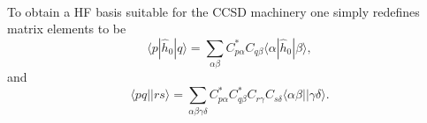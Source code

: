\paragraph*{}
To obtain a HF basis suitable for the CCSD machinery one simply redefines matrix elements to be
\begin{equation}
\langle p | \hat{h}_0 | q \rangle = \sum_{\alpha \beta} C_{p\alpha}^{*} C_{q \beta} \langle \alpha | \hat{h}_0 | \beta \rangle ,
\end{equation}
and 
\begin{equation}
\langle pq || rs \rangle = \sum_{\alpha \beta \gamma \delta} C_{p\alpha}^{*} C_{q\beta}^{*} C_{r\gamma} C_{s\delta} \langle \alpha \beta || \gamma \delta \rangle .
\end{equation}



